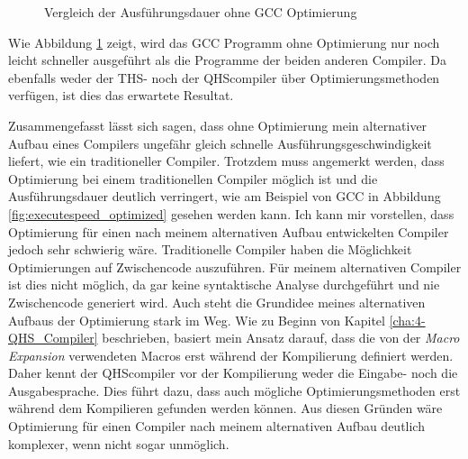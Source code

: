 \begin{figure}[H]
    \centering
    \label{fig:executespeed}
    \caption{Vergleich der Ausführungsdauer ohne GCC Optimierung}
\end{figure}

Wie Abbildung \ref{fig:executespeed} zeigt, wird das GCC Programm ohne Optimierung nur noch leicht schneller ausgeführt als die Programme der beiden anderen Compiler.
Da ebenfalls weder der THS- noch der QHScompiler über Optimierungsmethoden verfügen, ist dies das erwartete Resultat.

Zusammengefasst lässt sich sagen, dass ohne Optimierung mein alternativer Aufbau eines Compilers ungefähr gleich schnelle Ausführungsgeschwindigkeit liefert, wie ein traditioneller Compiler.
Trotzdem muss angemerkt werden, dass Optimierung bei einem traditionellen Compiler möglich ist und die Ausführungsdauer deutlich verringert, wie am Beispiel von GCC in Abbildung \ref{fig:executespeed_optimized} gesehen werden kann.
Ich kann mir vorstellen, dass Optimierung für einen nach meinem alternativen Aufbau entwickelten Compiler jedoch sehr schwierig wäre.
Traditionelle Compiler haben die Möglichkeit Optimierungen auf Zwischencode auszuführen. Für meinem alternativen Compiler ist dies nicht möglich, da gar keine syntaktische Analyse durchgeführt und nie Zwischencode generiert wird.
Auch steht die Grundidee meines alternativen Aufbaus der Optimierung stark im Weg.
Wie zu Beginn von Kapitel \ref{cha:4-QHS_Compiler} beschrieben, basiert mein Ansatz darauf, dass die von der \textit{Macro Expansion} verwendeten Macros erst während der Kompilierung definiert werden.
Daher kennt der QHScompiler vor der Kompilierung weder die Eingabe- noch die Ausgabesprache. Dies führt dazu, dass auch mögliche Optimierungsmethoden erst während dem Kompilieren gefunden werden können.
Aus diesen Gründen wäre Optimierung für einen Compiler nach meinem alternativen Aufbau deutlich komplexer, wenn nicht sogar unmöglich.


